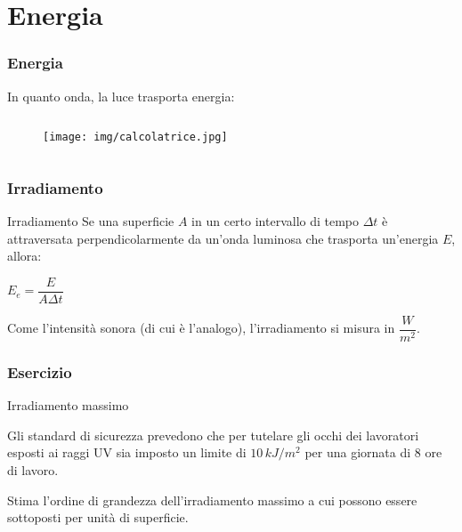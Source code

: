 \documentclass[]{beamer}
\theoremstyle{plain}
\begin{document}
\section{Energia}


\begin{frame}
  \frametitle{Energia}
  In quanto onda, la luce trasporta energia:
  \begin{columns}
    \begin{column}{0.3\textwidth}
      \begin{figure}
        \texttt{[image: img/calcolatrice.jpg]}
      \end{figure}
    \end{column}
    \begin{column}{0.3\textwidth}
    \end{column}
    \begin{column}{0.3\textwidth}
    \end{column}
  \end{columns}
\end{frame}


\begin{frame}
\frametitle{Irradiamento}

\begin{block}{Irradiamento}
Se una superficie $ A $ in un certo intervallo di tempo $ \Delta t $ è attraversata perpendicolarmente da un'onda luminosa che trasporta un'energia $ E $, allora:
\begin{center}
\colorbox{blue!30}{$ E_e = \dfrac{E}{A\Delta t} $}
\end{center}
Come l'intensità sonora (di cui è l'analogo), l'irradiamento si misura in $ \dfrac{W}{m^2} $.
\end{block}
\end{frame}



\begin{frame}
\frametitle{Esercizio}
\begin{exampleblock}{Irradiamento massimo}
{\small Gli standard di sicurezza prevedono che per tutelare gli occhi dei lavoratori esposti ai raggi UV sia imposto un limite di $ 10 \, kJ/m^2 $ per una giornata di 8 ore di lavoro.

Stima l'ordine di grandezza dell'irradiamento massimo a cui possono essere sottoposti per unità di superficie.}
\end{exampleblock}
\end{frame}
\end{document}
